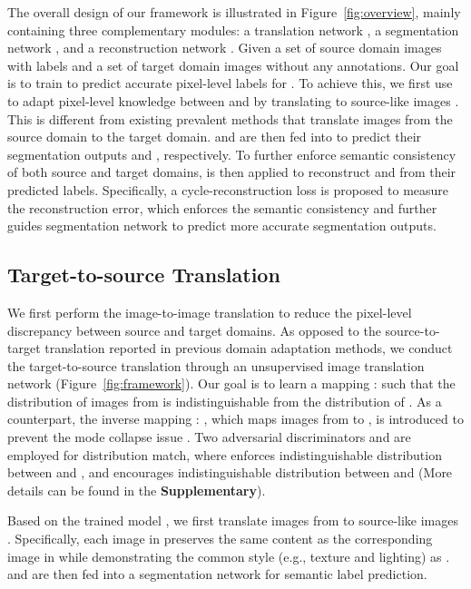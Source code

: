 \documentclass[runningheads]{llncs}
\begin{document}
	The overall design of our framework is illustrated in Figure~\ref{fig:overview}, mainly containing three complementary modules: a translation network , a segmentation network , and a reconstruction network . Given a set of source domain images  with labels  and a set of target domain images  without any annotations. Our goal is to train  to predict accurate pixel-level labels for . To achieve this, we first use  to adapt pixel-level knowledge between  and  by translating  to source-like images . This is different from existing prevalent methods that translate images from the source domain to the target domain.  and  are then fed into  to predict their segmentation outputs  and , respectively. To further enforce semantic consistency of both source and target domains,  is then applied to reconstruct  and  from their predicted labels. Specifically, a cycle-reconstruction loss is proposed to measure the reconstruction error, which enforces the semantic consistency and further guides segmentation network to predict more accurate segmentation outputs. 
	


	\subsection{Target-to-source Translation}


	We first perform the image-to-image translation to reduce the pixel-level discrepancy between source and target domains. As opposed to the source-to-target translation reported in previous domain adaptation methods, we conduct the target-to-source translation through an unsupervised image translation network (Figure~\ref{fig:framework}). Our goal is to learn a mapping  :  such that the distribution of images from  is indistinguishable from the distribution of . As a counterpart, the inverse mapping  : , which maps images from  to , is introduced to prevent the mode collapse issue \cite{goodfellow2016nips}. Two adversarial discriminators  and  are employed for distribution match, where  enforces indistinguishable distribution between  and , and  encourages indistinguishable distribution between  and  (More details can be found in the \textbf{Supplementary}).
	
	
	Based on the trained model , we first translate images from  to source-like images . Specifically, each image in  preserves the same content as the corresponding image in  while demonstrating the common style (e.g., texture and lighting) as .  and  are then fed into a segmentation network for semantic label prediction.
	
\end{document}

